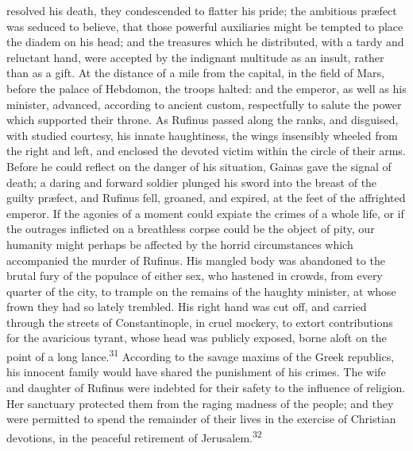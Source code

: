 resolved his death, they condescended to flatter his pride; the
ambitious præfect was seduced to believe, that those powerful
auxiliaries might be tempted to place the diadem on his head; and
the treasures which he distributed, with a tardy and reluctant
hand, were accepted by the indignant multitude as an insult,
rather than as a gift. At the distance of a mile from the
capital, in the field of Mars, before the palace of Hebdomon, the
troops halted: and the emperor, as well as his minister,
advanced, according to ancient custom, respectfully to salute the
power which supported their throne. As Rufinus passed along the
ranks, and disguised, with studied courtesy, his innate
haughtiness, the wings insensibly wheeled from the right and
left, and enclosed the devoted victim within the circle of their
arms. Before he could reflect on the danger of his situation,
Gainas gave the signal of death; a daring and forward soldier
plunged his sword into the breast of the guilty præfect, and
Rufinus fell, groaned, and expired, at the feet of the affrighted
emperor. If the agonies of a moment could expiate the crimes of a
whole life, or if the outrages inflicted on a breathless corpse
could be the object of pity, our humanity might perhaps be
affected by the horrid circumstances which accompanied the murder
of Rufinus. His mangled body was abandoned to the brutal fury of
the populace of either sex, who hastened in crowds, from every
quarter of the city, to trample on the remains of the haughty
minister, at whose frown they had so lately trembled. His right
hand was cut off, and carried through the streets of
Constantinople, in cruel mockery, to extort contributions for the
avaricious tyrant, whose head was publicly exposed, borne aloft
on the point of a long lance.\textsuperscript{31} According to the savage maxims
of the Greek republics, his innocent family would have shared the
punishment of his crimes. The wife and daughter of Rufinus were
indebted for their safety to the influence of religion. Her
sanctuary protected them from the raging madness of the people;
and they were permitted to spend the remainder of their lives in
the exercise of Christian devotions, in the peaceful retirement
of Jerusalem.\textsuperscript{32}



